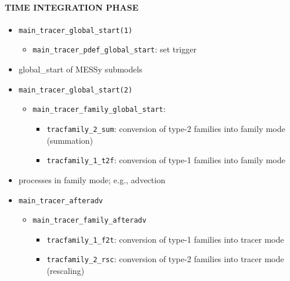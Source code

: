 \documentclass[twoside]{article}
\begin{document}
\paragraph{TIME INTEGRATION PHASE}
\begin{itemize}

  \item {\tt main\_tracer\_global\_start(1)}
        \begin{itemize}
          \item {\tt main\_tracer\_pdef\_global\_start}: set trigger
        \end{itemize}

  \item global\_start of MESSy submodels

  \item {\tt main\_tracer\_global\_start(2)}
        \begin{itemize}
          \item {\tt main\_tracer\_family\_global\_start}: 
                \begin{itemize} 
                 \item {\tt tracfamily\_2\_sum}:
                       conversion of type-2 families into
                       family mode (summation)
                 \item {\tt tracfamily\_1\_t2f}:
                       conversion of type-1 families into family mode
                \end{itemize} 
        \end{itemize}

  \item processes in family mode; e.g., advection

  \item {\tt main\_tracer\_afteradv}
        \begin{itemize}
          \item {\tt main\_tracer\_family\_afteradv}
                \begin{itemize}
                  \item {\tt tracfamily\_1\_f2t}:
                        conversion of type-1 families into
                        tracer mode
                  \item {\tt tracfamily\_2\_rsc}:
                        conversion of type-2 families into
                        tracer mode (rescaling)
                \end{itemize} 
        \end{itemize}


\end{itemize}
\end{document}
